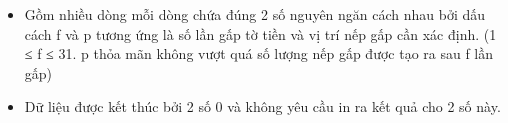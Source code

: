 \begin{itemize}
	\item     Gồm nhiều dòng mỗi dòng chứa đúng 2 số nguyên ngăn cách nhau bởi dấu cách f và p tương ứng là số lần gấp tờ tiền và vị trí nếp gấp cần xác định. (1 ≤ f ≤ 31. p thỏa mãn không vượt quá số lượng nếp gấp được tạo ra sau f lần gấp)   
	\item     Dữ liệu được kết thúc bởi 2 số 0 và không yêu cầu in ra kết quả cho 2 số này.   
\end{itemize}

\
